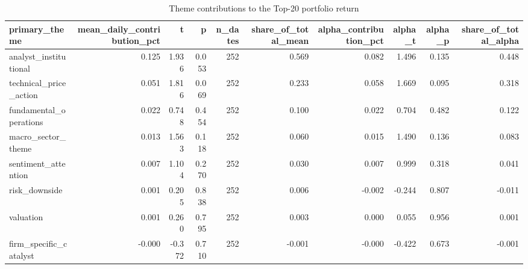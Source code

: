 \begin{table}[!htbp]\centering
\caption{Theme contributions to the Top-20 portfolio return}
\label{tab:deep_theme_contrib}
\begin{tabular}{lrrrrrrrrr}
\toprule
primary\_theme & mean\_daily\_contribution\_pct & t & p & n\_dates & share\_of\_total\_mean & alpha\_contribution\_pct & alpha\_t & alpha\_p & share\_of\_total\_alpha \\
\midrule
analyst\_institutional & 0.125 & 1.936 & 0.053 & 252 & 0.569 & 0.082 & 1.496 & 0.135 & 0.448 \\
technical\_price\_action & 0.051 & 1.816 & 0.069 & 252 & 0.233 & 0.058 & 1.669 & 0.095 & 0.318 \\
fundamental\_operations & 0.022 & 0.748 & 0.454 & 252 & 0.100 & 0.022 & 0.704 & 0.482 & 0.122 \\
macro\_sector\_theme & 0.013 & 1.563 & 0.118 & 252 & 0.060 & 0.015 & 1.490 & 0.136 & 0.083 \\
sentiment\_attention & 0.007 & 1.104 & 0.270 & 252 & 0.030 & 0.007 & 0.999 & 0.318 & 0.041 \\
risk\_downside & 0.001 & 0.205 & 0.838 & 252 & 0.006 & -0.002 & -0.244 & 0.807 & -0.011 \\
valuation & 0.001 & 0.260 & 0.795 & 252 & 0.003 & 0.000 & 0.055 & 0.956 & 0.001 \\
firm\_specific\_catalyst & -0.000 & -0.372 & 0.710 & 252 & -0.001 & -0.000 & -0.422 & 0.673 & -0.001 \\
\bottomrule
\end{tabular}
\end{table}
